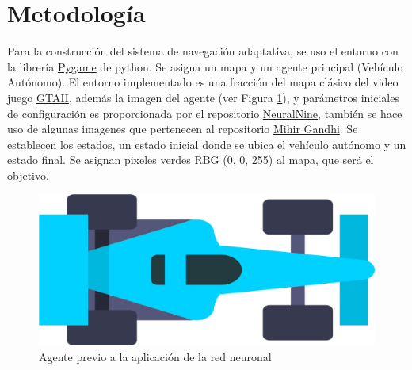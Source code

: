 \documentclass[conference]{IEEEtran}
\begin{document}

\section{Metodología}
Para la construcción del sistema de navegación adaptativa, se uso el entorno con la librería \href{https://www.pygame.org/wiki/GettingStarted}{Pygame} de python. Se asigna un mapa y un agente principal (Vehículo Autónomo). El entorno implementado es una fracción del mapa clásico del video juego \href{https://www.rockstargames.com/games/gta2}{GTAII}, además la imagen del agente (ver Figura \ref{fig:agente}), y parámetros iniciales de configuración es proporcionada por el repositorio \href{https://github.com/NeuralNine/ai-car-simulation}{NeuralNine}, también se hace uso de algunas imagenes que pertenecen al repositorio \href{https://github.com/mihir-m-gandhi/Traffic-Intersection-Simulation-with-Stats}{Mihir Gandhi}.
Se establecen los estados, un estado inicial donde se ubica el vehículo autónomo y un estado final. Se asignan pixeles verdes RBG (0, 0, 255) al mapa, que será el objetivo.
\begin{figure}[H]
    \centering    \includegraphics[width=0.3\linewidth]{images/car.png}
    \caption{Agente previo a la aplicación de la red neuronal}
    \label{fig:agente}
\end{figure}
\end{document}
